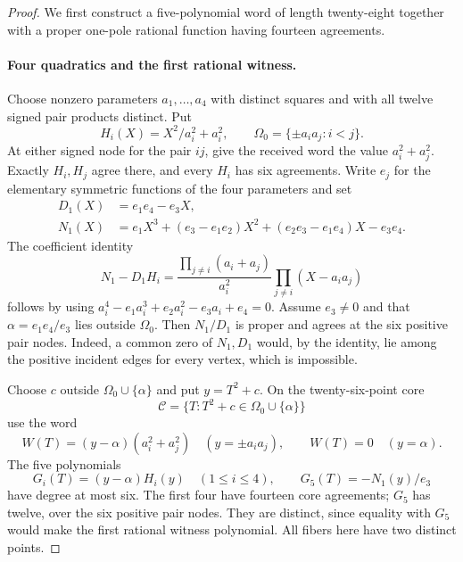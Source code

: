 \begin{proof}
We first construct a five-polynomial word of length twenty-eight together
with a proper one-pole rational function having fourteen agreements.

\paragraph{Four quadratics and the first rational witness.}
Choose nonzero parameters $a_1,\ldots,a_4$ with distinct squares and with
all twelve signed pair products distinct.  Put
\[
 H_i(X)=X^2/a_i^2+a_i^2,\qquad
 \Omega_0=\{\pm a_i a_j:i<j\}.
\]
At either signed node for the pair $ij$, give the received word the value
$a_i^2+a_j^2$.  Exactly $H_i,H_j$ agree there, and every $H_i$ has six
agreements.  Write $e_j$ for the elementary symmetric functions of the
four parameters and set
\begin{align*}
 D_1(X)&=e_1e_4-e_3X,\\
 N_1(X)&=e_1X^3+(e_3-e_1e_2)X^2
                 +(e_2e_3-e_1e_4)X-e_3e_4.
\end{align*}
The coefficient identity
\[
 N_1-D_1H_i
 =\frac{\prod_{j\ne i}(a_i+a_j)}{a_i^2}
       \prod_{j\ne i}(X-a_i a_j)
\]
follows by using
$a_i^4-e_1a_i^3+e_2a_i^2-e_3a_i+e_4=0$.
Assume $e_3\ne0$ and that
$\alpha=e_1e_4/e_3$ lies outside $\Omega_0$.
Then $N_1/D_1$ is proper and agrees at the six positive pair nodes.
Indeed, a common zero of $N_1,D_1$ would, by the identity, lie among the
positive incident edges for every vertex, which is impossible.

Choose $c$ outside $\Omega_0\cup\{\alpha\}$ and put $y=T^2+c$.
On the twenty-six-point core
\[
 \mathcal C=\{T:T^2+c\in\Omega_0\cup\{\alpha\}\}
\]
use the word
\[
 W(T)=(y-\alpha)(a_i^2+a_j^2)\quad(y=\pm a_i a_j),
 \qquad W(T)=0\quad(y=\alpha).
\]
The five polynomials
\[
 G_i(T)=(y-\alpha)H_i(y)\quad(1\le i\le4),
 \qquad G_5(T)=-N_1(y)/e_3
\]
have degree at most six.  The first four have fourteen core agreements;
$G_5$ has twelve, over the six positive pair nodes.  They are distinct,
since equality with $G_5$ would make the first rational witness polynomial.
All fibers here have two distinct points.


\end{proof}
